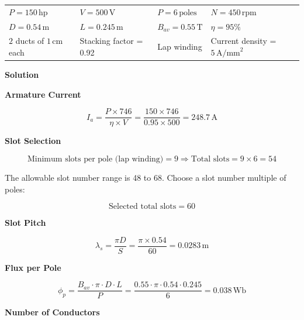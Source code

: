 \documentclass[12pt]{article}
\begin{document}
\begin{center}
	\begin{tabular}{>{\raggedright\arraybackslash}p{4cm} >{\raggedright\arraybackslash}p{4cm} >{\raggedright\arraybackslash}p{4cm} >{\raggedright\arraybackslash}p{4cm}}
		$P = 150\, \text{hp}$ & $V = 500\, \text{V}$ & $P = 6\, \text{poles}$ & $N = 450\, \text{rpm}$ \\
		$D = 0.54\, \text{m}$ & $L = 0.245\, \text{m}$ & $B_{av} = 0.55\, \text{T}$ & $\eta = 95\%$ \\
		$2$ ducts of $1\, \text{cm}$ each & Stacking factor = 0.92 & Lap winding & Current density = $5\, \text{A/mm}^2$ \\
	\end{tabular}
\end{center}

\vspace{10pt}

\noindent
\textbf{Solution}

\vspace{5pt}

\noindent
\textbf{Armature Current}

\[
I_a = \frac{P \times 746}{\eta \times V} = \frac{150 \times 746}{0.95 \times 500} = 248.7\, \text{A}
\]

\vspace{5pt}

\noindent
\textbf{Slot Selection}

\[
\text{Minimum slots per pole (lap winding)} = 9 \Rightarrow \text{Total slots} = 9 \times 6 = 54
\]

The allowable slot number range is 48 to 68. Choose a slot number multiple of poles: 

\[
\text{Selected total slots} = 60
\]

\vspace{5pt}

\noindent
\textbf{Slot Pitch}

\[
\lambda_s = \frac{\pi D}{S} = \frac{\pi \times 0.54}{60} = 0.0283\, \text{m}
\]

\vspace{5pt}

\noindent
\textbf{Flux per Pole}

\[
\phi_p = \frac{B_{av} \cdot \pi \cdot D \cdot L}{P} = \frac{0.55 \cdot \pi \cdot 0.54 \cdot 0.245}{6} = 0.038\, \text{Wb}
\]

\vspace{5pt}

\noindent
\textbf{Number of Conductors}
\end{document}
